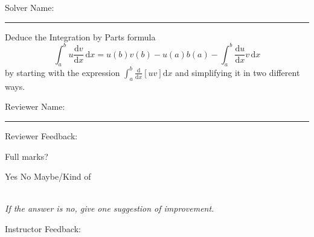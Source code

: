 \documentclass[12pt]{exam}
\newcommand{\dl}{\mathrm{d}}
\newcommand{\diff}[2]{\frac{\dl #1}{\dl #2}}
\begin{document}
\pagestyle{headandfoot}
\firstpageheadrule

Solver Name:\enspace\rule{5cm}{0.8pt}

\begin{questions}
\question

Deduce the Integration by Parts formula
\[\int_a^b u \diff vx \,\dl x = u(b)v(b) - u(a)b(a) - \int_a^b \diff ux v \,\dl x\]
by starting with the expression $\int_a^b \diff{}x[uv] \dl x$ and simplifying it in two different ways. 

\end{questions}

Reviewer Name:\enspace\rule{5cm}{0.8pt}

\begin{questions}
\question
Reviewer Feedback:

Full marks? \begin{oneparcheckboxes}
\choice Yes
\choice No
\choice Maybe/Kind of
\end{oneparcheckboxes}\\
\textit{If the answer is no, give one suggestion of improvement.}

\question

Instructor Feedback:

\end{questions}
\end{document}
